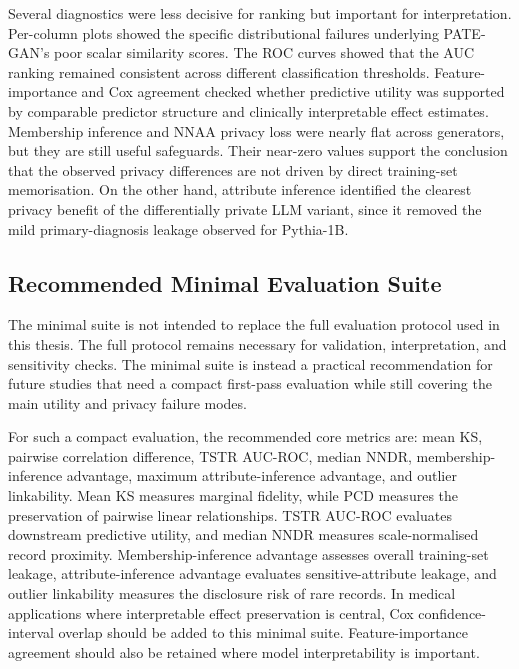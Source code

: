 Several diagnostics were less decisive for ranking but important for
interpretation. Per-column plots showed the specific distributional failures underlying
PATE-GAN's poor scalar similarity scores. The ROC curves showed that the AUC ranking 
remained consistent across different classification thresholds. Feature-importance and Cox
agreement checked whether predictive utility was supported by comparable
predictor structure and clinically interpretable effect estimates.
Membership inference and NNAA privacy loss were nearly flat across
generators, but they are still useful safeguards. Their near-zero values
support the conclusion that the observed privacy differences are not driven
by direct training-set memorisation. On the other hand, attribute inference
identified the clearest privacy benefit of the differentially private LLM
variant, since it removed the mild primary-diagnosis leakage observed for
Pythia-1B.

\subsection{Recommended Minimal Evaluation Suite}
\label{sec:results:rq1:minimal-suite}

The minimal suite is not intended to replace the full evaluation protocol
used in this thesis. The full protocol remains necessary for validation,
interpretation, and sensitivity checks. The minimal suite is instead a
practical recommendation for future studies that need a compact first-pass
evaluation while still covering the main utility and privacy failure
modes.

For such a compact evaluation, the recommended core metrics are:
mean KS, pairwise correlation difference, TSTR AUC-ROC, median NNDR,
membership-inference advantage, maximum attribute-inference advantage, and
outlier linkability. Mean KS measures marginal fidelity, while PCD measures the preservation
of pairwise linear relationships. TSTR AUC-ROC evaluates downstream
predictive utility, and median NNDR measures scale-normalised record
proximity. Membership-inference advantage assesses overall training-set
leakage, attribute-inference advantage evaluates sensitive-attribute
leakage, and outlier linkability measures the disclosure risk of rare
records. In medical applications where interpretable
effect preservation is central, Cox confidence-interval overlap should be
added to this minimal suite. Feature-importance agreement should also be retained
where model interpretability is important.

